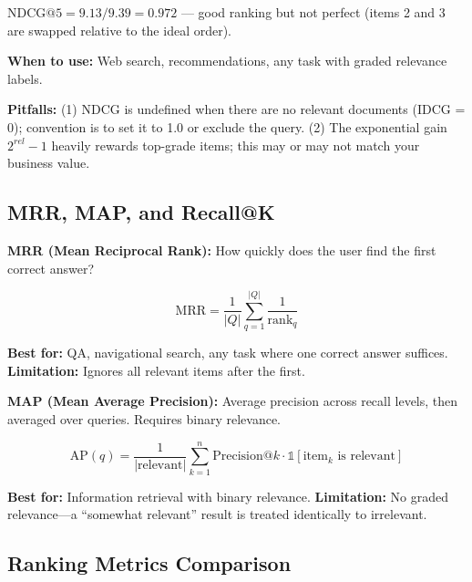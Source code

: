 $\text{NDCG}@5 = 9.13 / 9.39 = 0.972$ --- good ranking but not perfect (items 2 and 3 are swapped relative to the ideal order).

\textbf{When to use:} Web search, recommendations, any task with graded relevance labels.

\textbf{Pitfalls:} (1) NDCG is undefined when there are no relevant documents (IDCG = 0); convention is to set it to 1.0 or exclude the query. (2) The exponential gain $2^{rel} - 1$ heavily rewards top-grade items; this may or may not match your business value.

\subsection{MRR, MAP, and Recall@K}

\textbf{MRR (Mean Reciprocal Rank):} How quickly does the user find the first correct answer?

\[
\text{MRR} = \frac{1}{|Q|}\sum_{q=1}^{|Q|} \frac{1}{\text{rank}_q}
\]

\textbf{Best for:} QA, navigational search, any task where one correct answer suffices. \textbf{Limitation:} Ignores all relevant items after the first.

\textbf{MAP (Mean Average Precision):} Average precision across recall levels, then averaged over queries. Requires binary relevance.

\[
\text{AP}(q) = \frac{1}{|\text{relevant}|}\sum_{k=1}^{n} \text{Precision}@k \cdot \mathds{1}[\text{item}_k \text{ is relevant}]
\]

\textbf{Best for:} Information retrieval with binary relevance. \textbf{Limitation:} No graded relevance---a ``somewhat relevant'' result is treated identically to irrelevant.

\subsection{Ranking Metrics Comparison}

